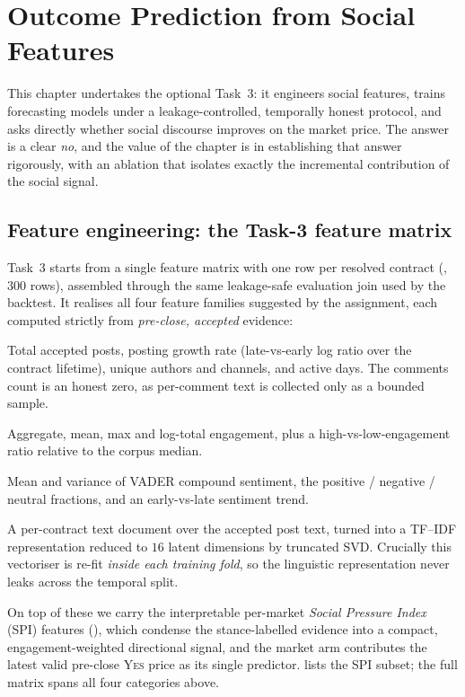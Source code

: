 
\chapter{Outcome Prediction from Social Features}
\label{ch:prediction}

This chapter undertakes the optional Task~3: it engineers social features, trains
forecasting models under a leakage-controlled, temporally honest protocol, and asks
directly whether social discourse improves on the market price. The answer is a clear
\emph{no}, and the value of the chapter is in establishing that answer rigorously, with
an ablation that isolates exactly the incremental contribution of the social signal.

\section{Feature engineering: the Task-3 feature matrix}
\label{sec:spi-features}
Task~3 starts from a single feature matrix with one row per resolved contract
(, $300$ rows), assembled through the same
leakage-safe evaluation join used by the backtest. It realises all four feature families suggested by the
assignment, each computed strictly from \emph{pre-close, accepted} evidence:
\begin{description}[leftmargin=1.4em,style=nextline]
  \item[Volume.] Total accepted posts, posting growth rate (late-vs-early log ratio over
  the contract lifetime), unique authors and channels, and active days. The comments
  count is an honest zero, as per-comment text is collected only as a bounded sample.
  \item[Engagement.] Aggregate, mean, max and log-total engagement, plus a
  high-vs-low-engagement ratio relative to the corpus median.
  \item[Sentiment.] Mean and variance of VADER compound sentiment, the positive /
  negative / neutral fractions, and an early-vs-late sentiment trend.
  \item[Linguistic.] A per-contract text document over the accepted post text, turned
  into a TF--IDF representation reduced to $16$ latent dimensions by truncated SVD.
  Crucially this vectoriser is re-fit \emph{inside each training fold}, so the linguistic
  representation never leaks across the temporal split.
\end{description}
On top of these we carry the interpretable per-market \emph{Social Pressure Index} (SPI)
features (), which condense the stance-labelled evidence into a
compact, engagement-weighted directional signal, and the market arm contributes the
latest valid pre-close \textsc{Yes} price as its single predictor. 
lists the SPI subset; the full matrix spans all four categories above.

